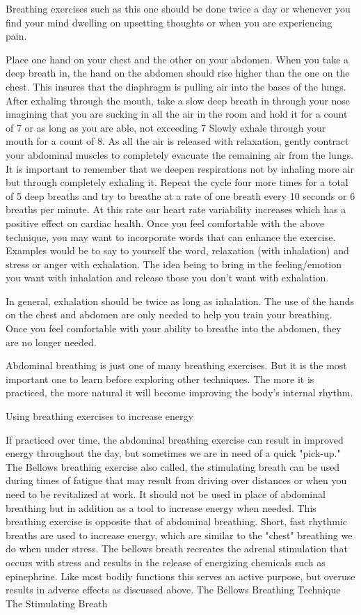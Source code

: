 \documentclass{book}\usepackage[]{graphicx}\usepackage[]{color}
\begin{document}
Breathing exercises such as this one should be done twice a day or whenever you find your mind dwelling on upsetting thoughts or when you are experiencing pain.

Place one hand on your chest and the other on your abdomen. When you take a deep breath in, the hand on the abdomen should rise higher than the one on the chest. This insures that the diaphragm is pulling air into the bases of the lungs.
After exhaling through the mouth, take a slow deep breath in through your nose imagining that you are sucking in all the air in the room and hold it for a count of 7 or as long as you are able, not exceeding 7
Slowly exhale through your mouth for a count of 8. As all the air is released with relaxation, gently contract your abdominal muscles to completely evacuate the remaining air from the lungs. It is important to remember that we deepen respirations not by inhaling more air but through completely exhaling it.
Repeat the cycle four more times for a total of 5 deep breaths and try to breathe at a rate of one breath every 10 seconds or 6 breaths per minute. At this rate our heart rate variability increases which has a positive effect on cardiac health.
Once you feel comfortable with the above technique, you may want to incorporate words that can enhance the exercise. Examples would be to say to yourself the word, relaxation (with inhalation) and stress or anger with exhalation. The idea being to bring in the feeling/emotion you want with inhalation and release those you don't want with exhalation.

In general, exhalation should be twice as long as inhalation. The use of the hands on the chest and abdomen are only needed to help you train your breathing. Once you feel comfortable with your ability to breathe into the abdomen, they are no longer needed.

Abdominal breathing is just one of many breathing exercises. But it is the most important one to learn before exploring other techniques. The more it is practiced, the more natural it will become improving the body's internal rhythm.

Using breathing exercises to increase energy

If practiced over time, the abdominal breathing exercise can result in improved energy throughout the day, but sometimes we are in need of a quick "pick-up." The Bellows breathing exercise also called, the stimulating breath can be used during times of fatigue that may result from driving over distances or when you need to be revitalized at work. It should not be used in place of abdominal breathing but in addition as a tool to increase energy when needed. This breathing exercise is opposite that of abdominal breathing. Short, fast rhythmic breaths are used to increase energy, which are similar to the "chest" breathing we do when under stress. The bellows breath recreates the adrenal stimulation that occurs with stress and results in the release of energizing chemicals such as epinephrine. Like most bodily functions this serves an active purpose, but overuse results in adverse effects as discussed above.
The Bellows Breathing Technique The Stimulating Breath
\end{document}
